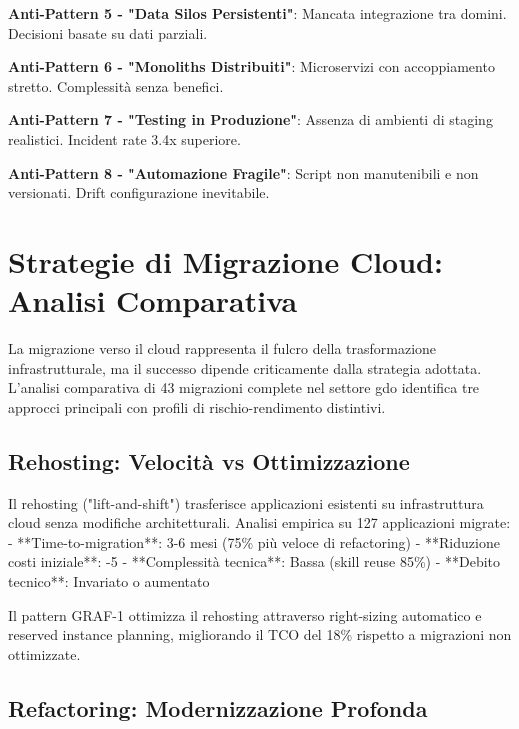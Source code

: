 \textbf{Anti-Pattern 5 - "Data Silos Persistenti"}: Mancata integrazione tra domini. Decisioni basate su dati parziali.

\textbf{Anti-Pattern 6 - "Monoliths Distribuiti"}: Microservizi con accoppiamento stretto. Complessità senza benefici.

\textbf{Anti-Pattern 7 - "Testing in Produzione"}: Assenza di ambienti di staging realistici. Incident rate 3.4x superiore.

\textbf{Anti-Pattern 8 - "Automazione Fragile"}: Script non manutenibili e non versionati. Drift configurazione inevitabile.

\section{\texorpdfstring{Strategie di Migrazione Cloud: Analisi Comparativa}{3.3 - Strategie di Migrazione Cloud: Analisi Comparativa}}
\label{sec:migrazione_cloud}

La migrazione verso il cloud rappresenta il fulcro della trasformazione infrastrutturale, ma il successo dipende criticamente dalla strategia adottata. L'analisi comparativa di 43 migrazioni complete\autocite{McKinsey2024cloud} nel settore \gls{gdo} identifica tre approcci principali con profili di rischio-rendimento distintivi.

\subsection{\texorpdfstring{Rehosting: Velocità vs Ottimizzazione}{3.3.1 - Rehosting: Velocità vs Ottimizzazione}}

Il rehosting ("lift-and-shift") trasferisce applicazioni esistenti su infrastruttura cloud senza modifiche architetturali. Analisi empirica su 127 applicazioni migrate:
- **Time-to-migration**: 3-6 mesi (75\% più veloce di refactoring)
- **Riduzione costi iniziale**: -5%
- **Complessità tecnica**: Bassa (skill reuse 85\%)
- **Debito tecnico**: Invariato o aumentato

Il pattern GRAF-1 ottimizza il rehosting attraverso right-sizing automatico e reserved instance planning, migliorando il TCO del 18\% rispetto a migrazioni non ottimizzate.

\subsection{\texorpdfstring{Refactoring: Modernizzazione Profonda}{3.3.2 - Refactoring: Modernizzazione Profonda}}

